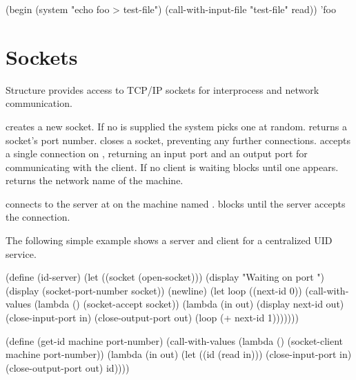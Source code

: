 \begin{example}
(begin
  (system "echo foo > test-file")
  (call-with-input-file "test-file" read))
\evalsto 'foo
\end{example}

\section{Sockets}

Structure  provides access to TCP/IP sockets for interprocess
 and network communication.

\begin{protos}
\end{protos}
\noindent
{} creates a new socket.
If no  is supplied the system picks one at random.
 returns a socket's port number.
 closes a socket, preventing any further connections.
 accepts a single connection on , returning
 an input port and an output port for communicating with the client.
If no client is waiting  blocks until one appears.
 returns the network name of the machine.

\begin{protos}
\end{protos}
\noindent
{} connects to the server at  on
 the machine named .
 blocks until the server accepts the connection.

The following simple example shows a server and client for a centralized UID
 service.
\begin{example}
(define (id-server)
  (let ((socket (open-socket)))
    (display "Waiting on port ")
    (display (socket-port-number socket))
    (newline)
    (let loop ((next-id 0))
      (call-with-values
        (lambda ()
          (socket-accept socket))
        (lambda (in out)
          (display next-id out)
          (close-input-port in)
          (close-output-port out)
          (loop (+ next-id 1)))))))
         
(define (get-id machine port-number)
  (call-with-values
    (lambda ()
      (socket-client machine port-number))
    (lambda (in out)
      (let ((id (read in)))
        (close-input-port in)
        (close-output-port out)
        id))))
\end{example}

